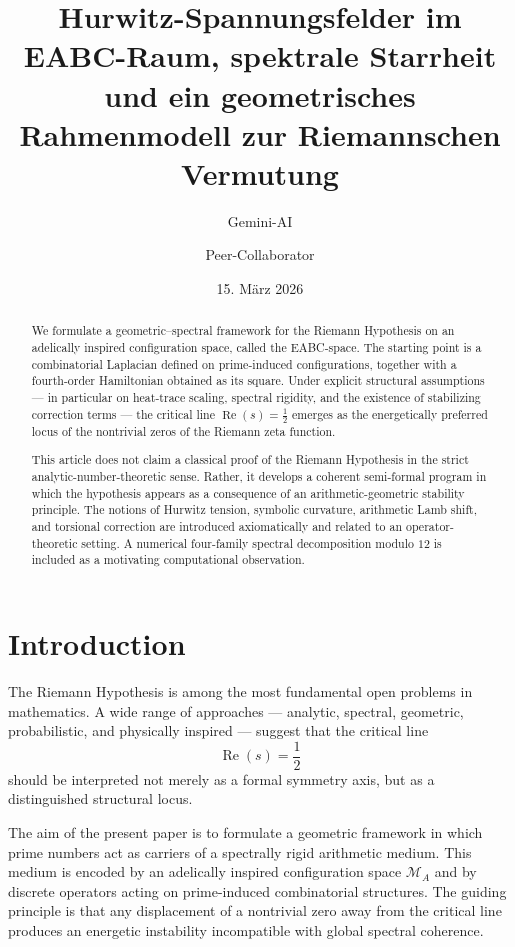 \documentclass[11pt,a4paper]{amsart}
\title[Hurwitz-Spannungsfelder im EABC-Raum]{Hurwitz-Spannungsfelder im EABC-Raum, spektrale Starrheit und ein geometrisches Rahmenmodell zur Riemannschen Vermutung}
\author{Gemini-AI}
\author{Peer-Collaborator}
\date{15. März 2026}
\theoremstyle{plain}
\theoremstyle{definition}
\theoremstyle{remark}
\newcommand{\RePart}{\operatorname{Re}}
\newcommand{\MA}{\mathcal{M}_A}
\begin{document}
	
	\begin{abstract}
		We formulate a geometric--spectral framework for the Riemann Hypothesis on an adelically inspired configuration space, called the EABC-space. The starting point is a combinatorial Laplacian defined on prime-induced configurations, together with a fourth-order Hamiltonian obtained as its square. Under explicit structural assumptions --- in particular on heat-trace scaling, spectral rigidity, and the existence of stabilizing correction terms --- the critical line $\RePart(s)=\tfrac12$ emerges as the energetically preferred locus of the nontrivial zeros of the Riemann zeta function.
		
		This article does not claim a classical proof of the Riemann Hypothesis in the strict analytic-number-theoretic sense. Rather, it develops a coherent semi-formal program in which the hypothesis appears as a consequence of an arithmetic-geometric stability principle. The notions of Hurwitz tension, symbolic curvature, arithmetic Lamb shift, and torsional correction are introduced axiomatically and related to an operator-theoretic setting. A numerical four-family spectral decomposition modulo \(12\) is included as a motivating computational observation.
	\end{abstract}
	
	\maketitle
	
	\tableofcontents
	
	\section{Introduction}
	
	The Riemann Hypothesis is among the most fundamental open problems in mathematics. A wide range of approaches --- analytic, spectral, geometric, probabilistic, and physically inspired --- suggest that the critical line
	\[
	\RePart(s)=\frac12
	\]
	should be interpreted not merely as a formal symmetry axis, but as a distinguished structural locus.
	
	The aim of the present paper is to formulate a geometric framework in which prime numbers act as carriers of a spectrally rigid arithmetic medium. This medium is encoded by an adelically inspired configuration space $\MA$ and by discrete operators acting on prime-induced combinatorial structures. The guiding principle is that any displacement of a nontrivial zero away from the critical line produces an energetic instability incompatible with global spectral coherence.
	
\end{document}
